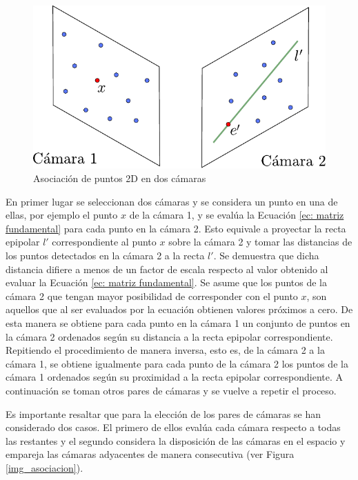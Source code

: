 \begin{figure}[ht!]
\begin{center}
\includegraphics[scale=0.7]{img/Reconstruccion/cam2cam.pdf}
\end{center}
\caption{Asociación de puntos 2D en dos cámaras}
\label{fig: cam2cam }
\end{figure}

En primer lugar se seleccionan dos cámaras y se considera un punto en una de ellas, por ejemplo el punto $x$ de la cámara 1, y se evalúa la Ecuación \ref{ec: matriz fundamental} para cada punto en la cámara 2. Esto equivale a proyectar la recta epipolar $l'$ correspondiente al punto $x$ sobre la cámara 2  y tomar las distancias de los puntos detectados en la cámara 2 a la recta $l'$. Se demuestra que dicha distancia difiere a menos de un factor de escala respecto al valor obtenido al evaluar la Ecuación \ref{ec: matriz fundamental}. Se asume que los puntos de la cámara 2 que tengan mayor posibilidad de corresponder con el punto $x$, son aquellos que al ser evaluados por la ecuación obtienen valores próximos a cero.
De esta manera se obtiene para cada punto en la cámara 1 un conjunto de puntos en la cámara 2 ordenados según su distancia a la recta epipolar correspondiente.
Repitiendo el procedimiento de manera inversa, esto es, de la cámara 2 a la cámara 1, se obtiene igualmente para cada punto de la cámara 2  los puntos de la cámara 1 ordenados según su proximidad a la recta epipolar correspondiente. A continuación se toman otros pares de cámaras y se vuelve a repetir el proceso. 

Es importante resaltar que para la elección de los pares de cámaras se han considerado dos casos.
El primero de ellos evalúa cada cámara respecto a todas las restantes y el segundo considera la disposición de las cámaras en el espacio y empareja las cámaras adyacentes de manera consecutiva (ver Figura \ref{img_asociacion}). %

